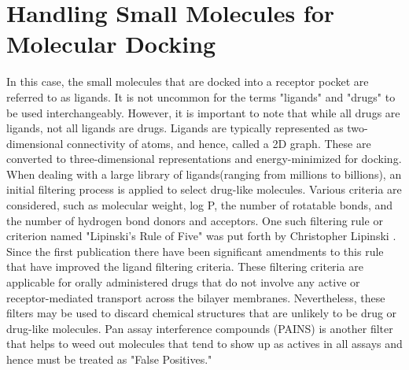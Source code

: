\chapter*{Handling Small Molecules for Molecular Docking}
In this case, the small molecules that are docked into a receptor pocket are referred to as ligands. It is not uncommon for the terms "ligands" and "drugs" to be used interchangeably. However, it is important to note that while all drugs are ligands, not all ligands are drugs. Ligands are typically represented as two-dimensional connectivity of atoms, and hence, called a 2D graph. These are converted to three-dimensional representations  and energy-minimized for docking.  When dealing with a large library of ligands\cite{bib10}(ranging from millions to billions), an initial filtering process is applied to select drug-like molecules. Various criteria are considered, such as molecular weight, log P, the number of rotatable bonds, and the number of hydrogen bond donors and acceptors. One such filtering  rule or criterion named "Lipinski's  Rule of Five" was put forth by Christopher Lipinski \cite{bib11}. Since the first publication there have been significant amendments to this rule that have improved the ligand filtering criteria\cite{bib12}. These filtering criteria are applicable for orally administered drugs that do not involve any active or receptor-mediated transport across the bilayer membranes. Nevertheless, these filters may be used to discard chemical structures that are unlikely to be drug or drug-like molecules. Pan assay interference compounds (PAINS)\cite{bib63, bib64} is another filter that helps to weed out molecules that tend to show up as actives in all assays and hence must be treated as "False Positives."

